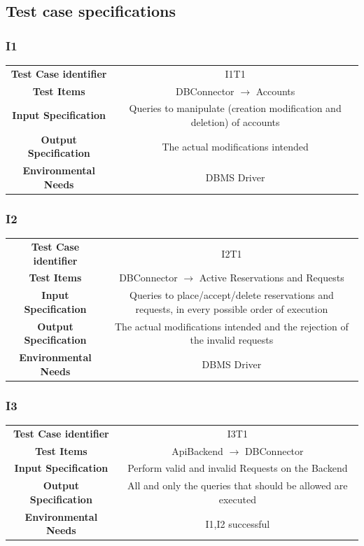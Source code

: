 \documentclass{article}
\begin{document}
\subsection{Test case specifications}
\subsubsection{I1}
\begin{adjustbox}{width=1.2\textwidth}	
	\begin{tabular}{*{2}{c}}
		\toprule
		\textbf{Test Case identifier} & I1T1\\
		\textbf{Test Items} & DBConnector $\rightarrow$ Accounts \\
		\textbf{Input Specification} & Queries to manipulate (creation modification and deletion) of accounts\\
		\textbf{Output Specification} & The actual modifications intended\\
		\textbf{Environmental Needs} & DBMS Driver\\
		\bottomrule
	\end{tabular}
\end{adjustbox}
\subsubsection{I2}
\begin{adjustbox}{width=1.2\textwidth}	
	\begin{tabular}{*{2}{c}}
		\toprule
		\textbf{Test Case identifier} & I2T1\\
		\textbf{Test Items} & DBConnector $\rightarrow$ Active Reservations and Requests \\
		\textbf{Input Specification} & Queries to place/accept/delete reservations and requests, in every possible order of execution\\
		\textbf{Output Specification} & The actual modifications intended and the rejection of the invalid requests\\
		\textbf{Environmental Needs} & DBMS Driver\\
		\bottomrule
	\end{tabular}
\end{adjustbox}
\subsubsection{I3}
\begin{adjustbox}{width=1.2\textwidth}	
	\begin{tabular}{*{2}{c}}
		\toprule
		\textbf{Test Case identifier} & I3T1\\
		\textbf{Test Items} & ApiBackend $\rightarrow$ DBConnector\\
		\textbf{Input Specification} & Perform valid and invalid Requests on the Backend\\
		\textbf{Output Specification} & All and only the queries that should be allowed are executed\\
		\textbf{Environmental Needs} & I1,I2 successful\\
		\bottomrule
	\end{tabular}
\end{adjustbox}
\end{document}
